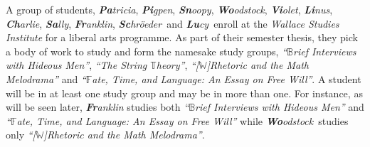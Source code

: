 \documentclass[MS,synopsis]{iitmdiss}
\begin{document}
\def \LLL {{\em ``$\mathbb{B}$rief Interviews with Hideous Men''}}
\def \GGG {{\em ``The String $\mathbb{T}$heory''}} 
\def \BBB {{\em ``[$\mathbb{W}$]Rhetoric and the Math Melodrama''}}
\def \TTT {{\em ``$\mathbb{F}$ate, Time, and Language: An Essay on Free Will''}}


\def \xLLL {\mathbb{B}}
\def \xGGG {\mathbb{T}} 
\def \xBBB {\mathbb{W}}
\def \xTTT {\mathbb{F}}




\def \Pa {{\em {\bf Pa}tricia}} 
\def \Pi {{\em {\bf Pi}gpen}} %
\def \Sn {{\em {\bf Sn}oopy}}
\def \Wo {{\em {\bf Wo}odstock}}
\def \Vi {{\em {\bf Vi}olet}} 
\def \Li {{\em {\bf Li}nus}} 
\def \Ch {{\em {\bf Ch}arlie}}
\def \Sa {{\em {\bf Sa}lly}}
\def \Fr {{\em {\bf Fr}anklin}}  %
\def \Sc {{\em {\bf Sc}hr{\"o}eder}} 
\def \Lu {{\em {\bf Lu}cy}}

\def \xPa {{\bf Pa}} 
\def \xPi {{\bf Pi}} 
\def \xSn {{\bf Sn}}
\def \xWo {{\bf Wo}}
\def \xVi {{\bf Vi}} 
\def \xLi {{\bf Li}} 
\def \xCh {{\bf Ch}}
\def \xSa {{\bf Sa}}
\def \xFr {{\bf Fr}}
\def \xSc {{\bf Sc}} 
\def \xLu {{\bf Lu}}

\def \residenceblock {{\em Infinite Loop}}

\def \WSI {{\em Wallace Studies Institute}}

\def \coneohone {{\em ``Influence of post modernism in Wallace's work''}}
\def \coneohtwo {{\em ``A study on fragmented prose method''}}


A group of students, \Pa, \Pi, \Sn, \Wo, \Vi, \Li, \Ch, \Sa, \Fr,
  \Sc\ and \Lu\ enroll at the
  {\WSI} for a liberal arts programme.  As part of their semester
  thesis, they pick a body of work to study and form the namesake
  study groups, {\LLL}, {\GGG}, {\BBB} and {\TTT}. A student will be in at least one study
  group and may be in more than one. For instance, as will be seen
  later, {\Fr} studies both {\LLL} and {\TTT} while \Wo\ studies only
  \BBB.
\end{document}
